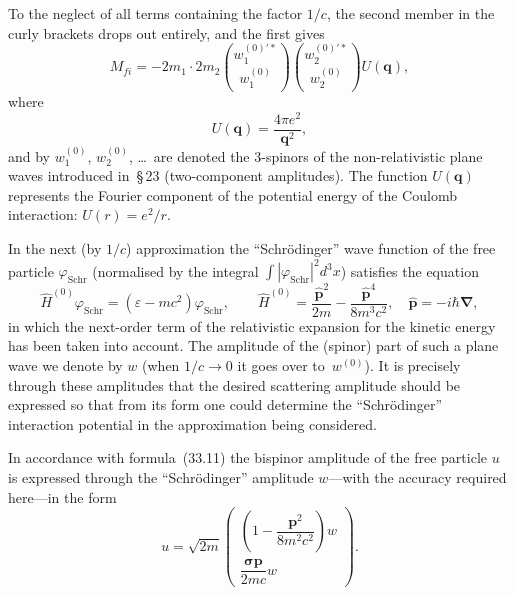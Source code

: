 To the neglect of all terms containing the factor $1/c$, the second member in the curly brackets drops out entirely, and the first gives
\begin{equation}
M_{fi} = -2m_1\cdot 2m_2\binom{w_1^{(0)'\ast}}{w_1^{(0)}}\binom{w_2^{(0)'\ast}}{w_2^{(0)}} U(\mathbf{q}),
\tag{83.4}
\end{equation}
where
\begin{equation}
U(\mathbf{q}) = \frac{4\pi e^2}{\mathbf{q}^2},
\tag{83.5}
\end{equation}
and by $w_1^{(0)}$, $w_2^{(0)}$, \ldots\ are denoted the 3-spinors of the non-relativistic plane waves introduced in~\S\,23 (two-component amplitudes). The function $U(\mathbf{q})$ represents the Fourier component of the potential energy of the Coulomb interaction: $U(r) = e^2/r$.

In the next (by $1/c$) approximation the ``Schr\"odinger'' wave function of the free particle $\varphi_\text{Schr}$ (normalised by the integral $\int|\varphi_\text{Schr}|^2 d^3x$) satisfies the equation
\begin{equation}
\hat{H}^{(0)}\varphi_\text{Schr} = (\varepsilon - mc^2)\varphi_\text{Schr},\qquad \hat{H}^{(0)} = \frac{\hat{\mathbf{p}}^2}{2m}-\frac{\hat{\mathbf{p}}^4}{8m^3c^2},\quad \hat{\mathbf{p}} = -i\hbar\boldsymbol{\nabla},
\tag{83.6}
\end{equation}
in which the next-order term of the relativistic expansion for the kinetic energy has been taken into account. The amplitude of the (spinor) part of such a plane wave we denote by $w$ (when $1/c \to 0$ it goes over to~$w^{(0)}$). It is precisely through these amplitudes that the desired scattering amplitude should be expressed so that from its form one could determine the ``Schr\"odinger'' interaction potential in the approximation being considered.

In accordance with formula~(33.11) the bispinor amplitude of the free particle $u$ is expressed through the ``Schr\"odinger'' amplitude $w$---with the accuracy required here---in the form
\begin{equation}
u = \sqrt{2m}\begin{pmatrix}\left(1 - \dfrac{\mathbf{p}^2}{8m^2c^2}\right)w\\[6pt] \dfrac{\boldsymbol{\sigma}\mathbf{p}}{2mc}w\end{pmatrix}.
\tag{83.7}
\end{equation}

